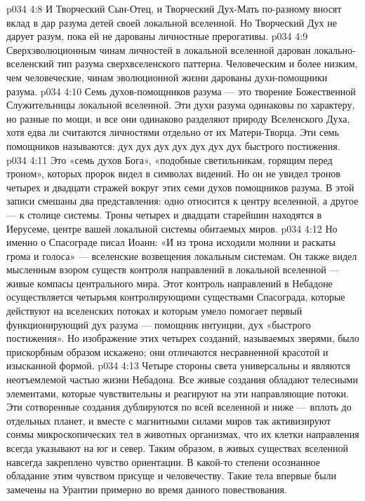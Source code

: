 \vs p034 4:8 \pc И Творческий Сын\hyp{}Отец, и Творческий Дух\hyp{}Мать по\hyp{}разному вносят вклад в дар разума детей своей локальной вселенной. Но Творческий Дух не дарует разум, пока ей не дарованы личностные прерогативы.
\vs p034 4:9 Сверхэволюционным чинам личностей в локальной вселенной дарован локально\hyp{}вселенский тип разума сверхвселенского паттерна. Человеческим и более низким, чем человеческие, чинам эволюционной жизни дарованы духи\hyp{}помощники разума.
\vs p034 4:10 \pc Семь духов\hyp{}помощников разума --- это творение Божественной Служительницы локальной вселенной. Эти духи разума одинаковы по характеру, но разные по мощи, и все они одинаково разделяют природу Вселенского Духа, хотя едва ли считаются личностями отдельно от их Матери\hyp{}Творца. Эти семь помощников называются: дух  дух  дух  дух  дух  дух  дух  быстрого постижения.
\vs p034 4:11 \pc Это «семь духов Бога», «подобные светильникам, горящим перед троном», которых пророк видел в символах видений. Но он не увидел тронов четырех и двадцати стражей вокруг этих семи духов помощников разума. В этой записи смешаны два представления: одно относится к центру вселенной, а другое --- к столице системы. Троны четырех и двадцати старейшин находятся в Иерусеме, центре вашей локальной системы обитаемых миров.
\vs p034 4:12 Но именно о Спасограде писал Иоанн: «И из трона исходили молнии и раскаты грома и голоса» --- вселенские возвещения локальным системам. Он также видел мысленным взором существ контроля направлений в локальной вселенной --- живые компасы центрального мира. Этот контроль направлений в Небадоне осуществляется четырьмя контролирующими существами Спасограда, которые действуют на вселенских потоках и которым умело помогает первый функционирующий дух разума --- помощник интуиции, дух «быстрого постижения». Но изображение этих четырех созданий, называемых зверями, было прискорбным образом искажено; они отличаются несравненной красотой и изысканной формой.
\vs p034 4:13 Четыре стороны света универсальны и являются неотъемлемой частью жизни Небадона. Все живые создания обладают телесными элементами, которые чувствительны и реагируют на эти направляющие потоки. Эти сотворенные создания дублируются по всей вселенной и ниже --- вплоть до отдельных планет, и вместе с магнитными силами миров так активизируют сонмы микроскопических тел в животных организмах, что их клетки направления всегда указывают на юг и север. Таким образом, в живых существах вселенной навсегда закреплено чувство ориентации. В какой\hyp{}то степени осознанное обладание этим чувством присуще и человечеству. Такие тела впервые были замечены на Урантии примерно во время данного повествования.
